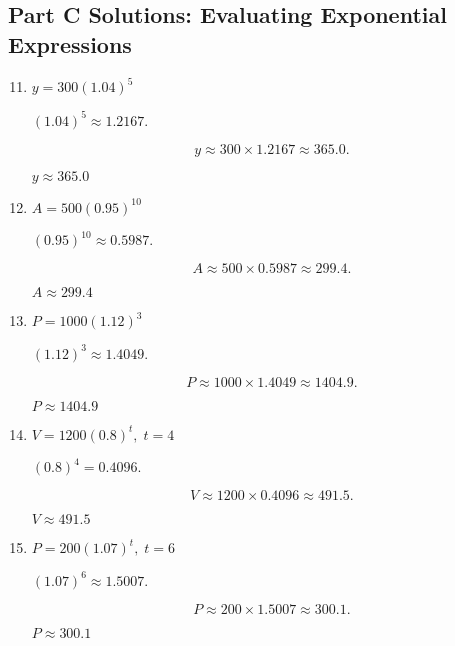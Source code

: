 \documentclass[12pt]{article}
\begin{document}
\subsection*{Part C Solutions: Evaluating Exponential Expressions}
\begin{enumerate}
  \setcounter{enumi}{10}
  \item \(y = 300(1.04)^5\)

  \((1.04)^5 \approx 1.2167.\)

  \[
  y \approx 300 \times 1.2167 \approx 365.0.
  \]

  \(\boxed{y \approx 365.0}\)

  \item \(A = 500(0.95)^{10}\)

  \((0.95)^{10} \approx 0.5987.\)

  \[
  A \approx 500 \times 0.5987 \approx 299.4.
  \]

  \(\boxed{A \approx 299.4}\)

  \item \(P = 1000(1.12)^3\)

  \((1.12)^3 \approx 1.4049.\)

  \[
  P \approx 1000 \times 1.4049 \approx 1404.9.
  \]

  \(\boxed{P \approx 1404.9}\)

  \item \(V = 1200(0.8)^t,\; t=4\)

  \((0.8)^4 = 0.4096.\)

  \[
  V \approx 1200 \times 0.4096 \approx 491.5.
  \]

  \(\boxed{V \approx 491.5}\)

  \item \(P = 200(1.07)^t,\; t=6\)

  \((1.07)^6 \approx 1.5007.\)

  \[
  P \approx 200 \times 1.5007 \approx 300.1.
  \]

  \(\boxed{P \approx 300.1}\)
\end{enumerate}
\end{document}
